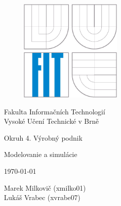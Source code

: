 \documentclass[12pt,a4paper,titlepage,final]{article}
\begin{document}

\def\projname{Okruh 4. Výrobný podnik}


\begin{titlepage}

\begin{figure}[!h]
  \centering
  \includegraphics[height=5cm]{doc/logo.eps}
\end{figure}
\center Fakulta Informačních Technologií \\
\center Vysoké Učení Technické v Brně \\

\vfill

\begin{center}
\bigskip
\begin{Huge}
\projname\\
\end{Huge}
\begin{large}
Modelovanie a simulácie\\
\end{large}
\end{center}

\vfill

\begin{center}
\begin{Large}
\today
\end{Large}
\end{center}

\vfill

\begin{flushleft}
\begin{large}
Marek Milkovič (xmilko01)\\
Lukáš Vrabec (xvrabe07) \\
\end{large}
\end{flushleft}
\end{titlepage}

\pagestyle{plain}
\tableofcontents
\end{document}
